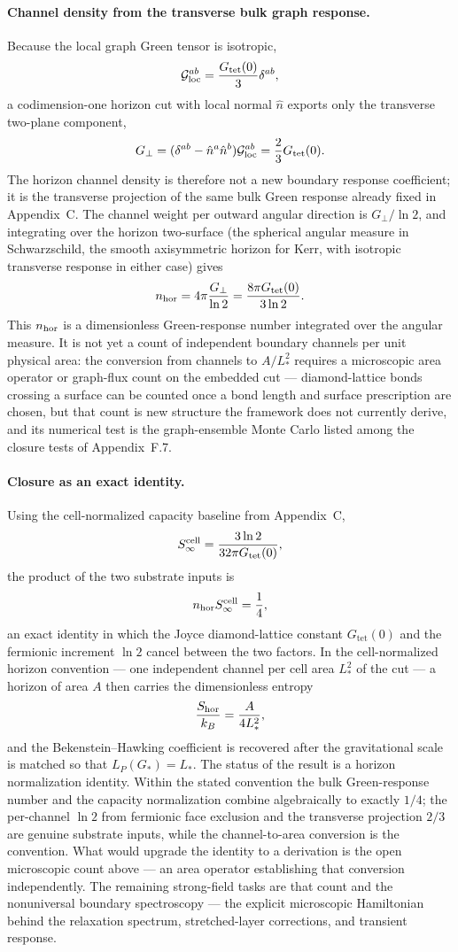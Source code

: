 \documentclass[11pt]{article}
\begin{document}
\paragraph{Channel density from the transverse bulk graph response.}
Because the local graph Green tensor is isotropic,
\[
{\cal G}_{\rm loc}^{ab}=\frac{G_{\mathrm{tet}}(0)}{3}\delta^{ab},
\]
a codimension-one horizon cut with local normal $\hat n$ exports only the transverse two-plane component,
\[
G_\perp=(\delta^{ab}-\hat n^a\hat n^b){\cal G}_{\rm loc}^{ab}=\frac23G_{\mathrm{tet}}(0).
\]
The horizon channel density is therefore not a new boundary response coefficient; it is the transverse projection of the same bulk Green response already fixed in Appendix~C. The channel weight per outward angular direction is $G_\perp/\ln 2$, and integrating over the horizon two-surface (the spherical angular measure in Schwarzschild, the smooth axisymmetric horizon for Kerr, with isotropic transverse response in either case) gives
\[
n_{\rm hor}=4\pi\frac{G_\perp}{\ln 2}=\frac{8\pi G_{\mathrm{tet}}(0)}{3\ln 2}.
\]
This $n_{\rm hor}$ is a dimensionless Green-response number integrated over the angular measure. It is not yet a count of independent boundary channels per unit physical area: the conversion from channels to $A/L_*^2$ requires a microscopic area operator or graph-flux count on the embedded cut --- diamond-lattice bonds crossing a surface can be counted once a bond length and surface prescription are chosen, but that count is new structure the framework does not currently derive, and its numerical test is the graph-ensemble Monte Carlo listed among the closure tests of Appendix~F.7.

\paragraph{Closure as an exact identity.}
Using the cell-normalized capacity baseline from Appendix~C,
\[
S_\infty^{\rm cell}=\frac{3\ln 2}{32\pi G_{\mathrm{tet}}(0)},
\]
the product of the two substrate inputs is
\[
n_{\rm hor}S_\infty^{\rm cell}=\frac14,
\]
an exact identity in which the Joyce diamond-lattice constant $G_{\mathrm{tet}}(0)$ and the fermionic increment $\ln 2$ cancel between the two factors. In the cell-normalized horizon convention --- one independent channel per cell area $L_*^2$ of the cut --- a horizon of area $A$ then carries the dimensionless entropy
\[
\frac{S_{\rm hor}}{k_B}=\frac{A}{4L_*^2},
\]
and the Bekenstein--Hawking coefficient is recovered after the gravitational scale is matched so that $L_P(G_*)=L_*$. The status of the result is a horizon normalization identity. Within the stated convention the bulk Green-response number and the capacity normalization combine algebraically to exactly $1/4$; the per-channel $\ln 2$ from fermionic face exclusion and the transverse projection $2/3$ are genuine substrate inputs, while the channel-to-area conversion is the convention. What would upgrade the identity to a derivation is the open microscopic count above --- an area operator establishing that conversion independently. The remaining strong-field tasks are that count and the nonuniversal boundary spectroscopy --- the explicit microscopic Hamiltonian behind the relaxation spectrum, stretched-layer corrections, and transient response.
\end{document}

